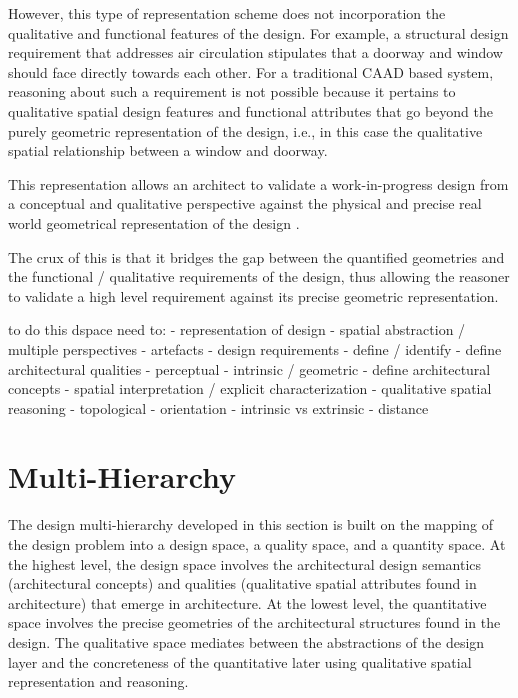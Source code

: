 \documentclass[12pt]{ucthesis}
\begin{document}
However, this type of representation scheme does not incorporation the qualitative and functional features of the design. For example, a structural design requirement that addresses air circulation stipulates that a doorway and window should face directly towards each other. For a traditional CAAD based system, reasoning about such a requirement is not possible because it pertains to qualitative spatial design features and functional attributes that go beyond the purely geometric representation of the design, i.e., in this case the qualitative spatial relationship between a window and doorway.

This representation allows an architect to validate a work-in-progress design from a conceptual and qualitative perspective against the physical and precise real world geometrical representation of the design \cite{Bhatt}.

 The crux of this is that it bridges the gap between the quantified geometries and the functional / qualitative requirements of the design, thus allowing the reasoner to validate a high level requirement against its precise geometric representation. 

to do this dspace need to:
 - representation of design
 	- spatial abstraction / multiple perspectives
 	- artefacts
 - design requirements - define / identify
 	- define architectural qualities
 		- perceptual
 		- intrinsic / geometric
 	- define architectural concepts
	- spatial interpretation / explicit characterization
 - qualitative spatial reasoning
 	- topological 
 	- orientation
 		- intrinsic vs extrinsic
 	- distance

\section{Multi-Hierarchy}
The design multi-hierarchy developed in this section is built on the mapping of the design problem into a design space, a quality space, and a quantity space. At the highest level, the design space involves the architectural design semantics (architectural concepts) and qualities (qualitative spatial attributes found in architecture) that emerge in architecture. At the lowest level, the quantitative space involves the precise geometries of the architectural structures found in the design. The qualitative space mediates between the abstractions of the design layer and the concreteness of the quantitative later using qualitative spatial representation and reasoning.
 
\end{document}
